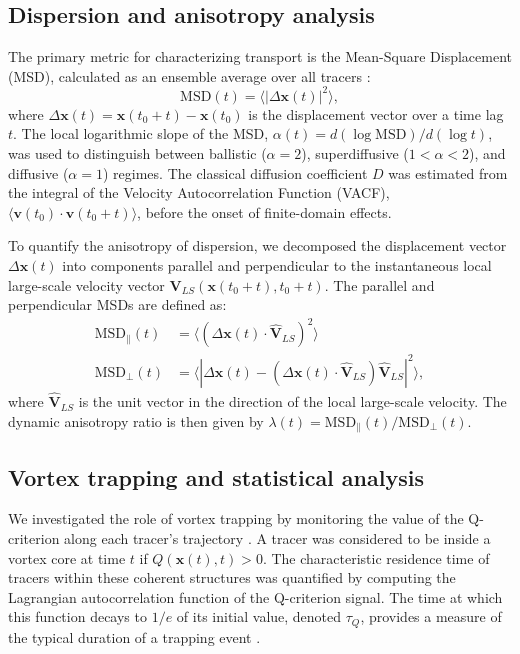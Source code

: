 \documentclass[]{article}
\begin{document}
\subsection{Dispersion and anisotropy analysis}
The primary metric for characterizing transport is the Mean-Square Displacement (MSD), calculated as an ensemble average over all tracers \citep{katayama2025notetwopointmeansquare}:
\begin{equation}
\text{MSD}(t) = \langle |\Delta\mathbf{x}(t)|^2 \rangle,
\end{equation}
where $\Delta\mathbf{x}(t) = \mathbf{x}(t_0+t) - \mathbf{x}(t_0)$ is the displacement vector over a time lag $t$. The local logarithmic slope of the MSD, $\alpha(t) = d(\log \text{MSD}) / d(\log t)$, was used to distinguish between ballistic ($\alpha=2$), superdiffusive ($1 < \alpha < 2$), and diffusive ($\alpha=1$) regimes. The classical diffusion coefficient $D$ was estimated from the integral of the Velocity Autocorrelation Function (VACF), $\langle \mathbf{v}(t_0) \cdot \mathbf{v}(t_0+t) \rangle$, before the onset of finite-domain effects.

To quantify the anisotropy of dispersion, we decomposed the displacement vector $\Delta\mathbf{x}(t)$ into components parallel and perpendicular to the instantaneous local large-scale velocity vector $\mathbf{V}_{LS}(\mathbf{x}(t_0+t), t_0+t)$. The parallel and perpendicular MSDs are defined as:
\begin{align}
\text{MSD}_{\parallel}(t) &= \langle (\Delta\mathbf{x}(t) \cdot \hat{\mathbf{V}}_{LS})^2 \rangle \\
\text{MSD}_{\perp}(t) &= \langle |\Delta\mathbf{x}(t) - (\Delta\mathbf{x}(t) \cdot \hat{\mathbf{V}}_{LS}) \hat{\mathbf{V}}_{LS}|^2 \rangle,
\end{align}
where $\hat{\mathbf{V}}_{LS}$ is the unit vector in the direction of the local large-scale velocity. The dynamic anisotropy ratio is then given by $\lambda(t) = \text{MSD}_{\parallel}(t) / \text{MSD}_{\perp}(t)$.

\subsection{Vortex trapping and statistical analysis}
We investigated the role of vortex trapping by monitoring the value of the Q-criterion along each tracer's trajectory \citep{bhatia2021numericalstudytrailingleading}. A tracer was considered to be inside a vortex core at time $t$ if $Q(\mathbf{x}(t), t) > 0$. The characteristic residence time of tracers within these coherent structures was quantified by computing the Lagrangian autocorrelation function of the Q-criterion signal. The time at which this function decays to $1/e$ of its initial value, denoted $\tau_Q$, provides a measure of the typical duration of a trapping event \citep{kapoor2024trappingextremeclusteringfinitelydense}.
\end{document}
